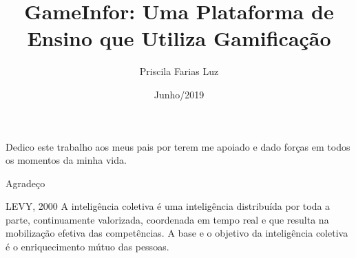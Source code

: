 \documentclass[en,twoside,onehalfspacing,bsc]{risethesis}
\title{GameInfor: Uma Plataforma de Ensino que Utiliza Gamificaç\~{a}o}
\date{Junho/2019}
\author{Priscila Farias Luz}
\begin{document}
\frontmatter
\frontpage
\presentationpage

\begin{dedicatory}
Dedico este trabalho aos meus pais por terem me apoiado e dado forças em todos os momentos da minha vida. 
\end{dedicatory}

\acknowledgements
Agradeço 

\begin{epigraph}[]{LEVY, 2000}
A inteligência coletiva é uma inteligência distribuída por toda a parte, continuamente valorizada, coordenada em tempo real e que resulta na mobilização efetiva das competências. A base e o objetivo da inteligência coletiva é o enriquecimento mútuo das pessoas.
\end{epigraph}

\resumo

\abstract
% 

\tableofcontents


\listoftables

% 


\mainmatter


% 


% 
% 





\end{document}
